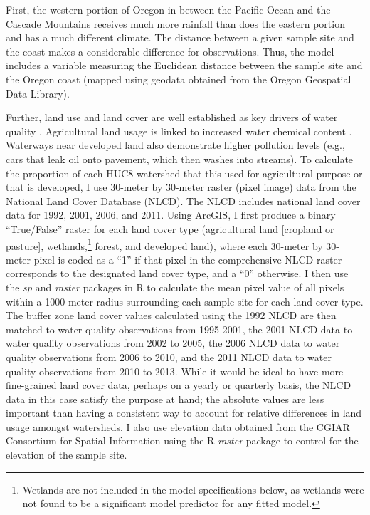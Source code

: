 \documentclass[11pt,a4paper,titlepage]{article}
\begin{document}
First, the western portion of Oregon in between the Pacific Ocean and the Cascade Mountains receives much more rainfall than does the eastern portion and has a much different climate. The distance between a given sample site and the coast makes a considerable difference for observations. Thus, the model includes a variable measuring the Euclidean distance between the sample site and the Oregon coast (mapped using geodata obtained from the Oregon Geospatial Data Library). 

Further, land use and land cover are well established as key drivers of water quality \parencite{tong2002,meador2003}. Agricultural land usage is linked to increased water chemical content \parencite{skaggs1994,johnes1997}. Waterways near developed land also demonstrate higher pollution levels \parencite{wang2001} (e.g., cars that leak oil onto pavement, which then washes into streams). To calculate the proportion of each HUC8 watershed that this used for agricultural purpose or that is developed, I use 30-meter by 30-meter raster (pixel image) data from the National Land Cover Database (NLCD). The NLCD includes national land cover data for 1992, 2001, 2006, and 2011. Using ArcGIS, I first produce a binary “True/False” raster for each land cover type (agricultural land [cropland or pasture], wetlands,\footnote{Wetlands are not included in the model specifications below, as wetlands were not found to be a significant model predictor for any fitted model.} forest, and developed land), where each 30-meter by 30-meter pixel is coded as a “1” if that pixel in the comprehensive NLCD raster corresponds to the designated land cover type, and a “0” otherwise. I then use the \textit{sp} \parencite{pebesma2014} and \textit{raster} \parencite{hijmans2014} packages in R to calculate the mean pixel value of all pixels within a 1000-meter radius surrounding each sample site for each land cover type. The buffer zone land cover values calculated using the 1992 NLCD are then matched to water quality observations from 1995-2001, the 2001 NLCD data to water quality observations from 2002 to 2005, the 2006 NLCD data to water quality observations from 2006 to 2010, and the 2011 NLCD data to water quality observations from 2010 to 2013. While it would be ideal to have more fine-grained land cover data, perhaps on a yearly or quarterly basis, the NLCD data in this case satisfy the purpose at hand; the absolute values are less important than having a consistent way to account for relative differences in land usage amongst watersheds. I also use elevation data obtained from the CGIAR Consortium for Spatial Information using the R \textit{raster} package \parencite{hijmans2014} to control for the elevation of the sample site.  
\end{document}
